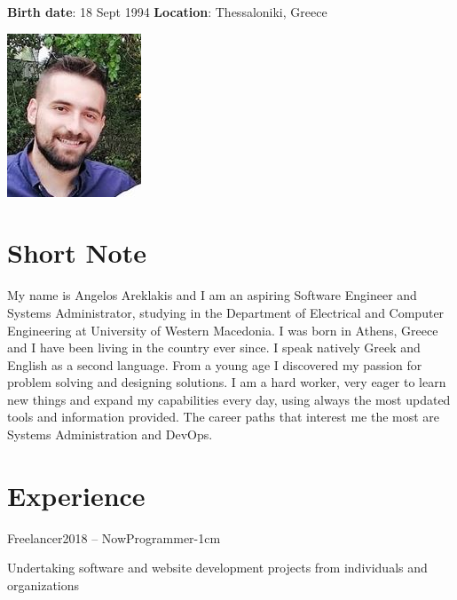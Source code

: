 \documentclass{mycv}
\begin{document}
	\pagestyle{empty}
	\begin{minipage}{.7\textwidth}
		\begin{flushleft}
			\centering
			{\bf Birth date}: 18 Sept 1994 {\Large\textperiodcentered} {\bf Location}: Thessaloniki, Greece
		\end{flushleft}
	\end{minipage}
	\begin{minipage}{.3\textwidth}
		\begin{flushright}
			\includegraphics[scale=0.05]{assets/angelos.JPG}
		\end{flushright}
	\end{minipage}
	\vspace*{-0.5cm}
	\section{Short Note}
	\textnormal My name is Angelos Areklakis and I am an aspiring Software Engineer and Systems Administrator, studying in the Department of Electrical and Computer Engineering at University of Western Macedonia. I was born in Athens, Greece and I have been living in the country ever since. I speak natively Greek and English as a second language. From a young age I discovered my passion for problem solving and designing solutions. I am a hard worker, very eager to learn new things and expand my capabilities every day, using always the most updated tools and information provided. The career paths that interest me the most are Systems Administration and DevOps.

	\section{Experience}

	\begin{EntryDated}{Freelancer}{}{2018 -- Now}{Programmer}{-1cm}
	\begin{Itemize}
		\item Undertaking software and website development projects from individuals and organizations
	\end{Itemize}
	\end{EntryDated}
\end{document}
